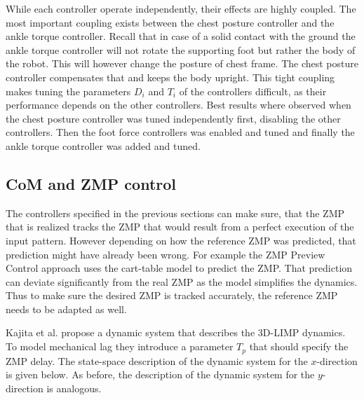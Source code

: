 \documentclass[english,ngerman]{KITreprt}
\begin{document}
While each controller operate independently, their effects are highly
coupled. The most important coupling exists between the chest posture
controller and the ankle torque controller. Recall that in case of a
solid contact with the ground the ankle torque controller will not
rotate the supporting foot but rather the body of the robot. This will
however change the posture of chest frame. The chest posture controller
compensates that and keeps the body upright. This tight coupling makes
tuning the parameters $D_i$ and $T_i$ of the controllers difficult, as
their performance depends on the other controllers. Best results where
observed when the chest posture controller was tuned independently
first, disabling the other controllers. Then the foot force controllers
was enabled and tuned and finally the ankle torque controller was added
and tuned.

\subsection{CoM and ZMP control}\label{com-and-zmp-control}

The controllers specified in the previous sections can make sure, that
the ZMP that is realized tracks the ZMP that would result from a perfect
execution of the input pattern. However depending on how the reference
ZMP was predicted, that prediction might have already been wrong. For
example the ZMP Preview Control approach uses the cart-table model to
predict the ZMP. That prediction can deviate significantly from the real
ZMP as the model simplifies the dynamics. Thus to make sure the desired
ZMP is tracked accurately, the reference ZMP needs to be adapted as
well.

Kajita et al. propose a dynamic system that describes the 3D-LIMP
dynamics. To model mechanical lag they introduce a parameter $T_p$ that
should specify the ZMP delay. The state-space description of the dynamic
system for the $x$-direction is given below. As before, the description
of the dynamic system for the $y$-direction is analogous.
\end{document}
